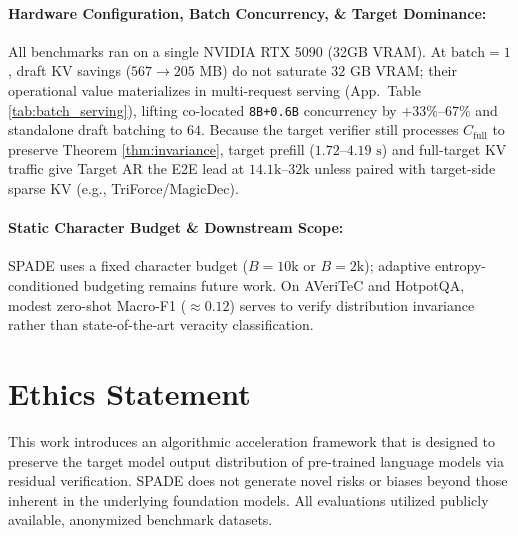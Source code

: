 \documentclass[11pt]{article}
\begin{document}
\paragraph{Hardware Configuration, Batch Concurrency, \& Target Dominance:}
All benchmarks ran on a single NVIDIA RTX 5090 (32GB VRAM). At $\text{batch}=1$, draft KV savings ($567 \to 205\text{ MB}$) do not saturate $32\text{ GB}$ VRAM; their operational value materializes in multi-request serving (App.\ Table \ref{tab:batch_serving}), lifting co-located \texttt{8B+0.6B} concurrency by $+33\%$--$67\%$ and standalone draft batching to $64$. Because the target verifier still processes $C_{\text{full}}$ to preserve Theorem \ref{thm:invariance}, target prefill ($1.72\text{--}4.19\text{ s}$) and full-target KV traffic give Target AR the E2E lead at $14.1\text{k}$--$32\text{k}$ unless paired with target-side sparse KV (e.g., TriForce/MagicDec).

\paragraph{Static Character Budget \& Downstream Scope:}
SPADE uses a fixed character budget ($B=10\text{k}$ or $B=2\text{k}$); adaptive entropy-conditioned budgeting remains future work. On AVeriTeC and HotpotQA, modest zero-shot Macro-F1 ($\approx 0.12$) serves to verify distribution invariance rather than state-of-the-art veracity classification.

\section*{Ethics Statement}
This work introduces an algorithmic acceleration framework that is designed to preserve the target model output distribution of pre-trained language models via residual verification. SPADE does not generate novel risks or biases beyond those inherent in the underlying foundation models. All evaluations utilized publicly available, anonymized benchmark datasets.



\appendix






\end{document}
